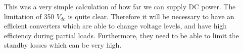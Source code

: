 \documentclass[]{scrartcl}
\begin{document}
This was a very simple calculation of how far we can supply DC power. The limitation of 350 $V_{dc}$ is quite clear. Therefore it will be necessary to have an efficient converters which are able to change voltage levels, and have high efficiency during partial loads. Furthermore, they need to be able to limit the standby losses which can be very high.





	\newpage
	{}
	
\end{document}
